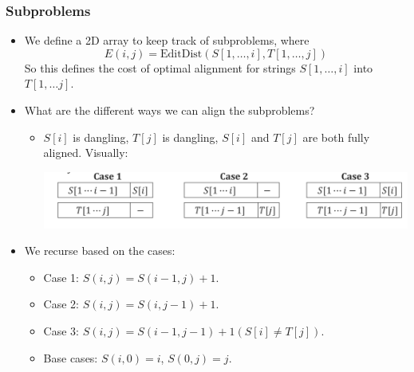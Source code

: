 	\subsubsection{Subproblems}
	\begin{itemize}
		\item We define a 2D array to keep track of subproblems, where 
			\[
				E(i, j) = \text{EditDist}(S[1, \dots, i], T[1, \dots, j])
			\] 
			So this defines the cost of optimal alignment for strings $S[1, \dots, i]$
			into $T\left[ 1, \dots j \right] $.
		\item What are the different ways we can align the subproblems?
			\begin{itemize}
				\item $S[i]$ is dangling, $T[j]$ is dangling, $S[i]$ and $T[j]$ are both fully aligned. 
					Visually:
					\begin{center}
						\includegraphics[scale=0.5]{alignment.png}
					\end{center}
			\end{itemize}
		\item We recurse based on the cases:
			\begin{itemize}
				\item Case 1: $S(i, j) = S(i-1, j) + 1$.
				\item Case 2: $S(i, j) = S(i, j-1) + 1$. 
				\item Case 3: $S(i, j) = S(i-1, j-1) + 1(S[i] \neq T[j])$.
				\item Base cases: $S(i, 0) = i$, $S(0, j) = j$. 


\end{itemize}
\end{itemize}

